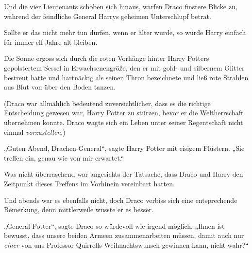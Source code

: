 Und die vier Lieutenants schoben sich hinaus, warfen Draco finstere Blicke zu, während der feindliche General Harrys geheimen Unterschlupf betrat.

Sollte er das nicht mehr tun dürfen, wenn er älter wurde, so würde Harry einfach für immer elf Jahre alt bleiben.

\later

Die Sonne ergoss sich durch die roten Vorhänge hinter Harry Potters gepolstertem Sessel in Erwachsenengröße, den er mit gold- und silbernem Glitter bestreut hatte und hartnäckig als seinen Thron bezeichnete und ließ rote Strahlen aus Blut von über den Boden tanzen.

(Draco war allmählich bedeutend zuversichtlicher, dass es die richtige Entscheidung gewesen war, Harry Potter zu stürzen, bevor er die Weltherrschaft übernehmen konnte. Draco wagte sich ein Leben unter seiner Regentschaft nicht einmal \emph{vorzustellen}.)

„Guten Abend, Drachen-General“, sagte Harry Potter mit eisigem Flüstern.
„Sie treffen ein, genau wie von mir erwartet.“

Was nicht überraschend war angesichts der Tatsache, dass Draco und Harry den Zeitpunkt dieses Treffens im Vorhinein vereinbart hatten.

Und abends war es ebenfalls nicht, doch Draco verbiss sich eine entsprechende Bemerkung, denn mittlerweile wusste er es besser.

„General Potter“, sagte Draco so würdevoll wie irgend möglich,
„Ihnen ist bewusst, dass unsere beiden Armeen zusammenarbeiten müssen, damit auch nur \emph{einer} von uns Professor Quirrells Weihnachtswunsch gewinnen kann, nicht wahr?“

